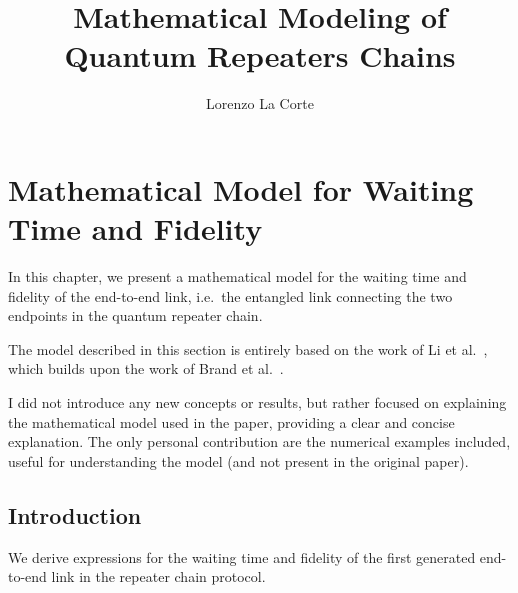 \documentclass{masterthesis}
\begin{document}
\title{Mathematical Modeling of Quantum Repeaters Chains}

\author{Lorenzo La Corte}

\advisor{}

\examiner{}

\maketitle

\tableofcontents






\chapter{Mathematical Model for Waiting Time and Fidelity}

In this chapter, we present a mathematical model for the waiting time and fidelity of the end-to-end link, i.e.\ the entangled link connecting the two endpoints in the quantum repeater chain.

The model described in this section is entirely based on the work of Li et al.~\cite{Li_2021}, which builds upon the work of Brand et al.~\cite{Brand_2020}.

I did not introduce any new concepts or results, but rather focused on explaining the mathematical model used in the paper, providing a clear and concise explanation.
The only personal contribution are the numerical examples included, useful for understanding the model (and not present in the original paper).

\section{Introduction}

We derive expressions for the waiting time and fidelity of the first generated end-to-end link in the repeater chain protocol. 
\end{document}
